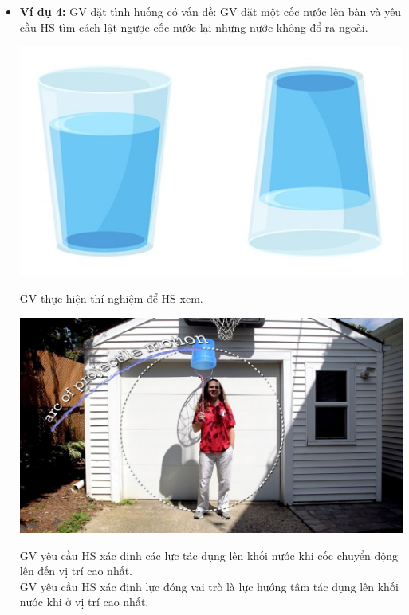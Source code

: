 {\begin{itemize}
\begin{itemize}
\begin{center}
			\end{center}
		\end{itemize}
		GV đặt câu hỏi: Vì sao ban đầu dây xích rất "mềm" không thể giữ được dạng vòng tròn, nhưng khi quay lại có thể chuyển động tròn trên mặt bàn?
		\item \textbf{Ví dụ 4:} GV đặt tình huống có vấn đề: GV đặt một cốc nước lên bàn và yêu cầu HS tìm cách lật ngược cốc nước lại nhưng nước không đổ ra ngoài.
		\begin{center}
			\includegraphics[scale=0.4]{figs/G10-BAI21-7}
		\end{center}
		GV thực hiện thí nghiệm để HS xem.
		\begin{center}
			\includegraphics[scale=0.25]{figs/G10-BAI21-9}
		\end{center}
		GV yêu cầu HS xác định các lực tác dụng lên khối nước khi cốc chuyển động lên đến vị trí cao nhất.\\
		GV yêu cầu HS xác định lực đóng vai trò là lực hướng tâm tác dụng lên khối nước khi ở vị trí cao nhất.
			\end{itemize}
}
